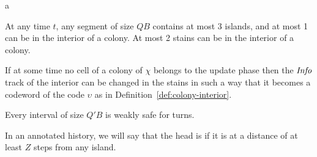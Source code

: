 \documentclass[11pt]{memoir}
\theoremstyle{definition} %
\renewcommand{\le}{\leq}
\newcommand{\fld}[1]{\ensuremath{\textit{#1\/}}}
\def\B{B}
\newcommand{\F}{F}
\newcommand{\Q}{Q} %
\newcommand{\Z}{Z} %
\newcommand{\Info}{\fld{Info}}
\newcommand{\Pass}{\fld{Pass}} %
\begin{document}
\begin{definition}[Annotation]
\begin{varenum}[series=annotated]{a}
  \item\label{i:annotated.num-islands} At any time \( t \), any segment of size \( \Q\B \)
    contains at most 3 islands, and at most 1 can be in the interior of a colony.
    At most 2 stains can be in the interior of a colony.

  \item If at some time no cell of a colony of \( \chi \) belongs to the update phase then
the \( \Info \) track of the interior can be changed in the stains in such a way that it becomes
a codeword of the code \( \upsilon \) as in Definition~\ref{def:colony-interior}.

  \item\label{i:annotated.turned}
    Every interval of size \( \Q'\B \) is weakly safe for turns.
\end{varenum}



  



In an annotated history, we will say that the head is  if it is at a distance of at least
  \( \Z \) steps from any island.
  \end{definition}
\end{document}
